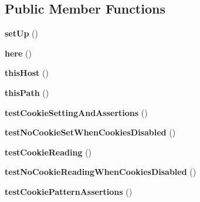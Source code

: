\subsection*{Public Member Functions}
\begin{DoxyCompactItemize}
\item 
\hypertarget{class_test_of_live_cookies_a0be0779f60bbe0a09f13d13361b468f9}{
{\bfseries setUp} ()}
\label{class_test_of_live_cookies_a0be0779f60bbe0a09f13d13361b468f9}

\item 
\hypertarget{class_test_of_live_cookies_a266694b442560a9140afc54e2fc0b6d2}{
{\bfseries here} ()}
\label{class_test_of_live_cookies_a266694b442560a9140afc54e2fc0b6d2}

\item 
\hypertarget{class_test_of_live_cookies_a048de5ba533acb3b369e891a9c632dee}{
{\bfseries thisHost} ()}
\label{class_test_of_live_cookies_a048de5ba533acb3b369e891a9c632dee}

\item 
\hypertarget{class_test_of_live_cookies_ae7e067d0d1cd8f55370c6821a715920a}{
{\bfseries thisPath} ()}
\label{class_test_of_live_cookies_ae7e067d0d1cd8f55370c6821a715920a}

\item 
\hypertarget{class_test_of_live_cookies_a0b705be09d6d9ab0be98e7be2f4cdc94}{
{\bfseries testCookieSettingAndAssertions} ()}
\label{class_test_of_live_cookies_a0b705be09d6d9ab0be98e7be2f4cdc94}

\item 
\hypertarget{class_test_of_live_cookies_a07bfeafbd6f9ce55983bc2b7ded6ab97}{
{\bfseries testNoCookieSetWhenCookiesDisabled} ()}
\label{class_test_of_live_cookies_a07bfeafbd6f9ce55983bc2b7ded6ab97}

\item 
\hypertarget{class_test_of_live_cookies_a40938d15e8ea2cbc12a44e36df0d9f7f}{
{\bfseries testCookieReading} ()}
\label{class_test_of_live_cookies_a40938d15e8ea2cbc12a44e36df0d9f7f}

\item 
\hypertarget{class_test_of_live_cookies_ae1d1c0c582da77f9536d35c2da57d4e9}{
{\bfseries testNoCookieReadingWhenCookiesDisabled} ()}
\label{class_test_of_live_cookies_ae1d1c0c582da77f9536d35c2da57d4e9}

\item 
\hypertarget{class_test_of_live_cookies_a1e8d18e945f495fbb33d9c7c601e2ae1}{
{\bfseries testCookiePatternAssertions} ()}
\label{class_test_of_live_cookies_a1e8d18e945f495fbb33d9c7c601e2ae1}


\end{DoxyCompactItemize}
